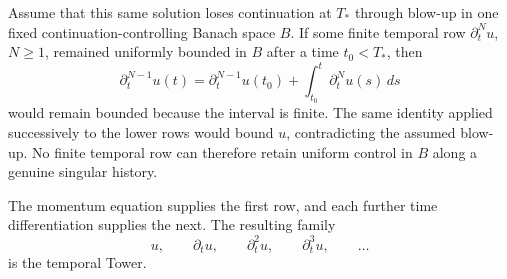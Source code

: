 Assume that this same solution loses continuation at \(T_*\) through blow-up in one fixed continuation-controlling Banach space \(B\).
If some finite temporal row \(\partial_t^N u\), \(N\geq1\), remained uniformly bounded in \(B\) after a time \(t_0<T_*\), then
\[
  \partial_t^{N-1}u(t)
  =
  \partial_t^{N-1}u(t_0)
  +
  \int_{t_0}^{t}\partial_t^N u(s)\,ds
\]
would remain bounded because the interval is finite.
The same identity applied successively to the lower rows would bound \(u\), contradicting the assumed blow-up.
No finite temporal row can therefore retain uniform control in \(B\) along a genuine singular history.

The momentum equation supplies the first row, and each further time differentiation supplies the next.
The resulting family
\[
  u,
  \qquad
  \partial_tu,
  \qquad
  \partial_t^2u,
  \qquad
  \partial_t^3u,
  \qquad
  \ldots
\]
is the temporal Tower.
